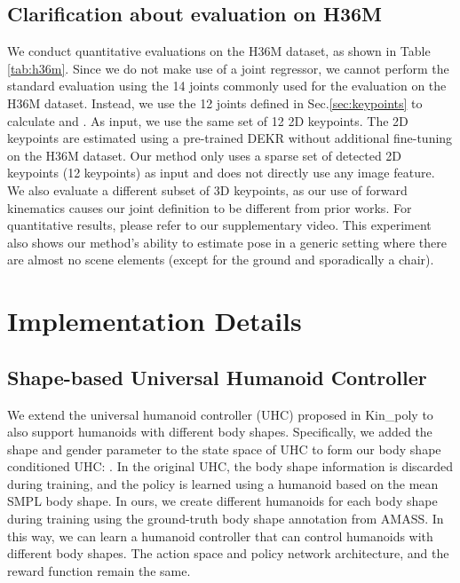 \subsection{Clarification about evaluation on H36M}
We conduct quantitative evaluations on the H36M dataset, as shown in Table \ref{tab:h36m}. Since we do not make use of a joint regressor, we cannot perform the standard evaluation using the 14 joints commonly used for the evaluation on the H36M dataset. Instead, we use the 12 joints defined in Sec.\ref{sec:keypoints} to calculate  and . As input, we use the same set of 12 2D keypoints. The 2D keypoints are estimated using a pre-trained DEKR \cite{Geng2021BottomUpHP} without additional fine-tuning on the H36M dataset. Our method only uses a sparse set of detected 2D keypoints (12 keypoints) as input and does not directly use any image feature. We also evaluate a different subset of 3D keypoints, as our use of forward kinematics  causes our joint definition to be different from prior works. For quantitative results, please refer to our supplementary video. This experiment also shows our method's ability to estimate pose in a generic setting where there are almost no scene elements (except for the ground and sporadically a chair).












\section{Implementation Details}

\subsection{Shape-based Universal Humanoid Controller}
We extend the universal humanoid controller (UHC) proposed in Kin\_poly \cite{Luo2021DynamicsRegulatedKP} to also support humanoids with different body shapes. Specifically, we added the shape and gender parameter  to the state space of UHC to form our body shape conditioned UHC: . In the original UHC, the body shape information is discarded during training, and the policy is learned using a humanoid based on the mean SMPL body shape. In ours, we create different humanoids for each body shape during training using the ground-truth body shape annotation from AMASS. In this way, we can learn a humanoid controller that can control humanoids with different body shapes. The action space and policy network architecture, and the reward function remain the same. 

